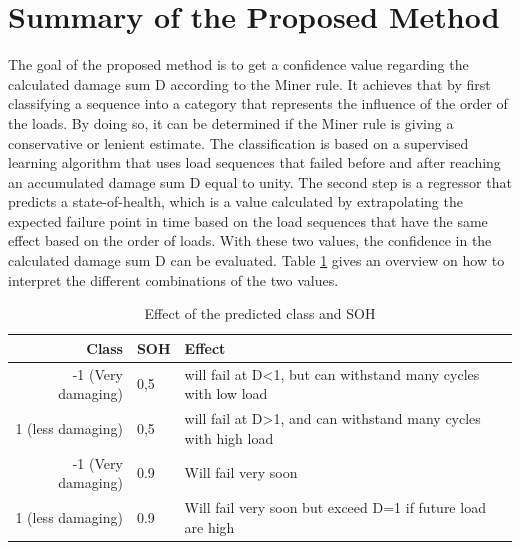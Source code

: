 \section{Summary of the Proposed Method}
The goal of the proposed method is to get a confidence value regarding the calculated damage sum D according to the Miner rule. It achieves that by first classifying a sequence into a category that represents the influence of the order of the loads. By doing so, it can be determined if the Miner rule is giving a conservative or lenient estimate. The classification is based on a supervised learning algorithm that uses load sequences that failed before and after reaching an accumulated damage sum D equal to unity. The second step is a regressor that predicts a state-of-health, which is a value calculated by extrapolating the expected failure point in time based on the load sequences that have the same effect based on the order of loads. With these two values, the confidence in the calculated damage sum D can be evaluated.
Table \ref{cases} gives an overview on how to interpret the different combinations of the two values. 

\begin{table}
	\begin{center}
		\begin{tabular}{|| r | l | l ||}
			\hline
			\rule{0pt}{2ex}Class & SOH & Effect\\
			\hline
			\hline
			\rule{0pt}{2ex}-1 (Very damaging)&  0,5 & will fail at D<1, but can withstand many cycles with low load\\\hline
			1 (less damaging)& 0,5 & will fail at D>1, and can withstand many cycles with high load\\\hline
			-1 (Very damaging)&  0.9 & Will fail very soon\\\hline
			1 (less damaging)& 0.9 & Will fail very soon but exceed D=1 if future load are high\\\hline
			\hline
		\end{tabular}
		\caption{Effect of the predicted class and SOH}
		\label{cases}
	\end{center}
	\vspace{-4mm}
\end{table}


\afterpage{\null\newpage}